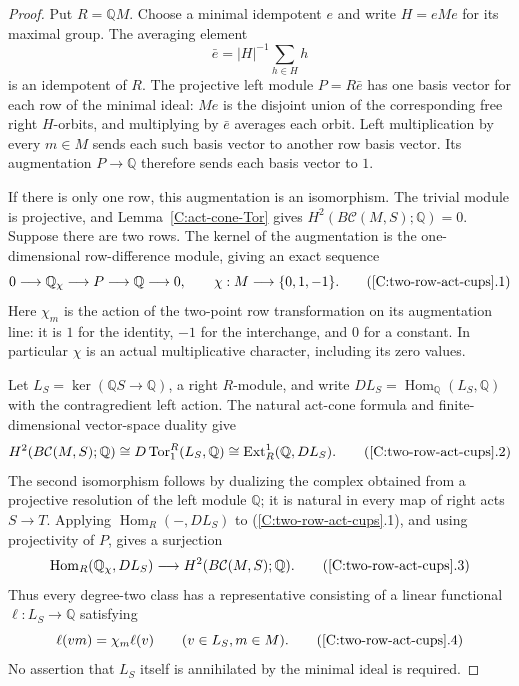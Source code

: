 \begin{proof}
Put $R=\mathbb QM$.  Choose a minimal idempotent $e$ and write
$H=eMe$ for its maximal group.  The averaging element
\[
 \bar e=|H|^{-1}\sum_{h\in H}h
\]
is an idempotent of $R$.  The projective left module $P=R\bar e$
has one basis vector for each row of the minimal ideal: $Me$ is
the disjoint union of the corresponding free right $H$-orbits,
and multiplying by $\bar e$ averages each orbit.  Left
multiplication by every $m\in M$ sends each such basis vector to
another row basis vector.  Its augmentation $P\to\mathbb Q$
therefore sends each basis vector to $1$.

If there is only one row, this augmentation is an isomorphism.
The trivial module is projective, and
Lemma~\ref{C:act-cone-Tor} gives $H^2(B\mathcal C(M,S);\mathbb Q)=0$.
Suppose there are two rows.  The kernel of the augmentation is
the one-dimensional row-difference module, giving an exact sequence
\[
 0\longrightarrow\mathbb Q_\chi\longrightarrow P
      \longrightarrow\mathbb Q\longrightarrow0,
 \qquad \chi:M\longrightarrow\{0,1,-1\}.             \tag{\ref{C:two-row-act-cups}.1}
\]
Here $\chi_m$ is the action of the two-point row transformation on
its augmentation line: it is $1$ for the identity, $-1$ for the
interchange, and $0$ for a constant.  In particular $\chi$ is an
actual multiplicative character, including its zero values.

Let $L_S=\ker(\mathbb QS\to\mathbb Q)$, a right $R$-module,
and write $D L_S=\operatorname{Hom}_{\mathbb Q}(L_S,\mathbb Q)$
with the contragredient left action.  The natural act-cone formula
and finite-dimensional vector-space duality give
\[
 H^2(B\mathcal C(M,S);\mathbb Q)
 \cong D\operatorname{Tor}_1^R(L_S,\mathbb Q)
 \cong\operatorname{Ext}_R^1(\mathbb Q,D L_S).        \tag{\ref{C:two-row-act-cups}.2}
\]
The second isomorphism follows by dualizing the complex obtained
from a projective resolution of the left module $\mathbb Q$;
it is natural in every map of right acts $S\to T$.
Applying $\operatorname{Hom}_R(-,D L_S)$ to
(\ref{C:two-row-act-cups}.1), and using projectivity of $P$, gives
a surjection
\[
 \operatorname{Hom}_R(\mathbb Q_\chi,D L_S)
 \longrightarrow H^2(B\mathcal C(M,S);\mathbb Q).     \tag{\ref{C:two-row-act-cups}.3}
\]
Thus every degree-two class has a representative consisting of a
linear functional $\ell:L_S\to\mathbb Q$ satisfying
\[
 \ell(v m)=\chi_m\ell(v)\qquad(v\in L_S, m\in M).  \tag{\ref{C:two-row-act-cups}.4}
\]
No assertion that $L_S$ itself is annihilated by the minimal ideal
is required.


\end{proof}
